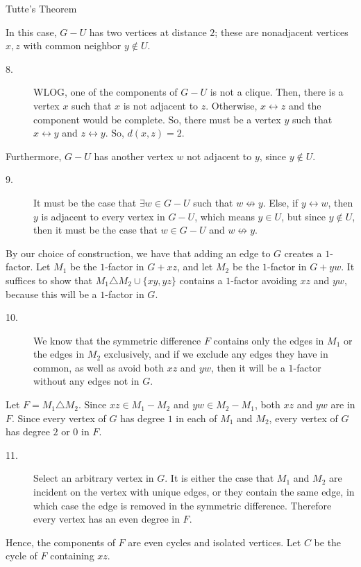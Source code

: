 \documentclass[9pt]{extarticle}
\begin{document}
{\begin{problem}{Tutte's Theorem}
\begin{description}[font=\scshape]
\begin{description}[font=\normalfont\scshape]
\begin{description}
\begin{center}
                \end{center}
            \end{description}
        \end{description}
      \item[Case 2: $G-U$ is not a disjoint union of cliques.] In this case, $G-U$ has two vertices at distance $2$; these are nonadjacent vertices $x,z$ with common neighbor $y\notin U$.
        \begin{description}
          \item[8.] WLOG, one of the components of $G-U$ is not a clique. Then, there is a vertex $x$ such that $x$ is not adjacent to $z$. Otherwise, $x\leftrightarrow z$ and the component would be complete. So, there must be a vertex $y$ such that $x\leftrightarrow y$ and $z\leftrightarrow y$. So, $d(x,z) = 2$.
        \end{description}
        Furthermore, $G-U$ has another vertex $w$ not adjacent to $y$, since $y\notin U$.
        \begin{description}
          \item[9.] It must be the case that $\exists w\in G-U$ such that $w\not\leftrightarrow y$. Else, if $y\leftrightarrow w$, then $y$ is adjacent to every vertex in $G-U$, which means $y\in U$, but since $y\notin U$, then it must be the case that $w\in G-U$ and $w\not\leftrightarrow y$.
        \end{description}
        By our choice of construction, we have that adding an edge to $G$ creates a $1$-factor. Let $M_1$ be the $1$-factor in $G + xz$, and let $M_2$ be the $1$-factor in $G + yw$. It suffices to show that $M_1 \triangle M_2 \cup \{xy,yz\}$ contains a $1$-factor avoiding $xz$ and $yw$, because this will be a $1$-factor in $G$.
        \begin{description}
          \item[10.] We know that the symmetric difference $F$ contains only the edges in $M_1$ or the edges in $M_2$ exclusively, and if we exclude any edges they have in common, as well as avoid both $xz$ and $yw$, then it will be a $1$-factor without any edges not in $G$.
        \end{description}
        Let $F = M_1\triangle M_2$. Since $xz \in M_1 - M_2$ and $yw \in M_2 - M_1$, both $xz$ and $yw$ are in $F$. Since every vertex of $G$ has degree $1$ in each of $M_1$ and $M_2$, every vertex of $G$ has degree $2$ or $0$ in $F$.
        \begin{description}
          \item[11.] Select an arbitrary vertex in $G$. It is either the case that $M_1$ and $M_2$ are incident on the vertex with unique edges, or they contain the same edge, in which case the edge is removed in the symmetric difference. Therefore every vertex has an even degree in $F$.
        \end{description}
        Hence, the components of $F$ are even cycles and isolated vertices. Let $C$ be the cycle of $F$ containing $xz$.\\


\end{description}
\end{problem}}
\end{document}
